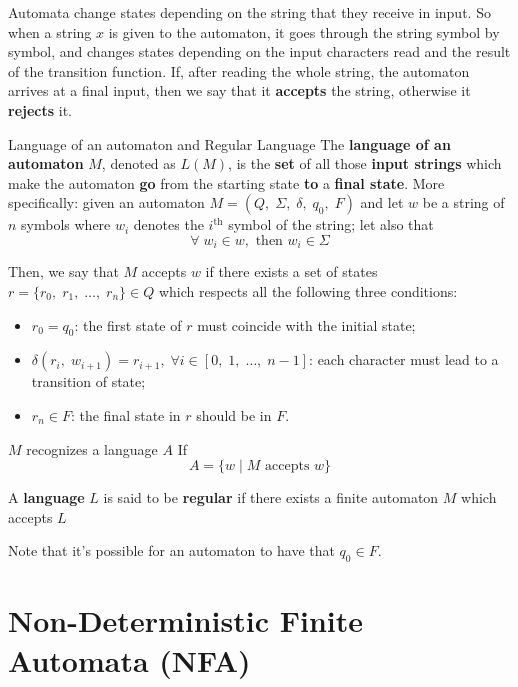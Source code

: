 \noindent Automata change states depending on the string that they receive in input. So when a string $x$ is given to the automaton, it goes through the string symbol by symbol, and changes states depending on the input characters read and the result of the transition function. If, after reading the whole string, the automaton arrives at a final input, then we say that it \textbf{accepts} the string, otherwise it \textbf{rejects} it.

\begin{definition}{Language of an automaton and Regular Language}
    The \textbf{language of an automaton} $M$, denoted as $L(M)$, is the \textbf{set} of all those \textbf{input strings} which make the automaton \textbf{go} from the starting state \textbf{to} a \textbf{final state}.
    \nl
    \noindent More specifically: given an automaton $M = (Q, \; \Sigma, \; \delta, \; q_{0}, \; F)$ and let $w$ be a string of $n$ symbols where $w_i$ denotes the $i^\text{th}$ symbol of the string; let also that
    \[ \forall \; w_{i} \in w, \text{ then } w_{i} \in \Sigma \]
    
    \noindent Then, we say that $M$ accepts $w$ if there exists a set of states $r = \{ r_{0}, \; r_{1}, \; \dots, \; r_{n} \} \in Q$ which respects all the following three conditions:
    \begin{itemize}
        \item $r_0 = q_0$: the first state of $r$ must coincide with the initial state;
        \item $\delta(r_{i}, \; w_{i + 1}) = r_{i + 1}, \; \forall  i \in [0, \; 1, \; \dots, \; n-1]$: each character must lead to a transition of state;
        \item $r_{n} \in F$: the final state in $r$ should be in $F$.
    \end{itemize}
    
    \noindent $M$ recognizes a language $A$ If
    \[ A = \{ w \; | \; M \text{ accepts } w \} \]

    \noindent A \textbf{language} $L$ is said to be \textbf{regular} if there exists a finite automaton $M$ which accepts $L$
\end{definition}

\noindent Note that it's possible for an automaton to have that $q_{0} \in F$.

\section{Non-Deterministic Finite Automata (NFA)}

